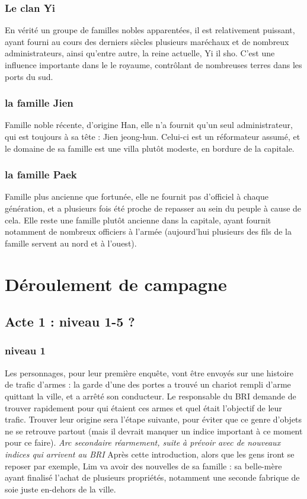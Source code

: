 \documentclass[10pt,a4paper]{book}
\begin{document}
\subsection{Le clan Yi}
En vérité un groupe de familles nobles apparentées, il est relativement puissant, ayant fourni au cours des derniers siècles plusieurs maréchaux et de nombreux administrateurs, ainsi qu'entre autre, la reine actuelle, Yi il sho. C'est une influence importante dans le le royaume, contrôlant de nombreuses terres dans les ports du sud.
\subsection{la famille Jien}
Famille noble récente, d'origine Han, elle n'a fournit qu'un seul administrateur, qui est toujours à sa tête : Jien jeong-hun. Celui-ci est un réformateur assumé, et le domaine de sa famille est une villa plutôt modeste, en bordure de la capitale.
\subsection{ la famille Paek}
Famille plus ancienne que fortunée, elle ne fournit pas d'officiel à chaque génération, et a plusieurs fois été proche de repasser au sein du peuple à cause de cela. Elle reste une famille plutôt ancienne dans la capitale, ayant fournit notamment de nombreux officiers à l'armée (aujourd'hui plusieurs des fils de la famille servent au nord et à l'ouest).
\chapter{Déroulement de campagne}
\section{Acte 1 : niveau 1-5 ?}
\subsection{niveau 1}
Les personnages, pour leur première enquête, vont être envoyés sur une histoire de trafic d'armes : la garde d'une des portes a trouvé un chariot rempli d'arme quittant la ville, et a arrêté son conducteur. Le responsable du BRI demande de trouver rapidement pour qui étaient ces armes et quel était l'objectif de leur trafic. Trouver leur origine sera l'étape suivante, pour éviter que ce genre d'objets ne se retrouve partout (mais il devrait manquer un indice important à ce moment pour ce faire). 
\emph{Arc secondaire réarmement, suite à prévoir avec de nouveaux indices qui arrivent au BRI}
Après cette introduction, alors que les gens iront se reposer par exemple, Lim va avoir des nouvelles de sa famille : sa belle-mère ayant finalisé l'achat de plusieurs propriétés, notamment une seconde fabrique de soie juste en-dehors de la ville. 
\end{document}
